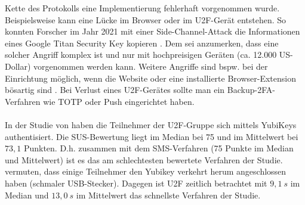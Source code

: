 Kette des Protokolls eine Implementierung fehlerhaft vorgenommen wurde. 
Beispielsweise kann eine Lücke im Browser oder im U2F-Gerät entstehen. So konnten 
Forscher im Jahr 2021 mit einer Side-Channel-Attack die Informationen eines Google 
Titan Security Key kopieren \autocite{Roche}. Dem sei anzumerken, dass eine solcher Angriff 
komplex ist und nur mit hochpreisigen Geräten (ca. 12.000 US-Dollar) vorgenommen 
werden kann. Weitere Angriffe sind bspw. bei der Einrichtung möglich, wenn die 
Website oder eine installierte Browser-Extension bösartig sind \autocite{Yadav}. Bei Verlust 
eines U2F-Gerätes sollte man ein Backup-2FA-Verfahren wie TOTP oder Push 
eingerichtet haben.
\\\\
In der Studie von \textcite{Reese} haben die Teilnehmer der U2F-Gruppe 
sich mittels YubiKeys authentisiert. Die SUS-Bewertung liegt im Median bei 75 und im 
Mittelwert bei $73{,}1$ Punkten. D.h. zusammen mit dem SMS-Verfahren 
(75 Punkte im Median und Mittelwert) ist es das am schlechtesten bewertete Verfahren 
der Studie. \textcite{Reese} vermuten, dass einige Teilnehmer den Yubikey verkehrt herum 
angeschlossen haben (schmaler USB-Stecker). Dagegen ist U2F zeitlich betrachtet mit 
$9{,}1~s$ im Median und $13{,}0~s$ im Mittelwert das schnellste Verfahren der Studie.
